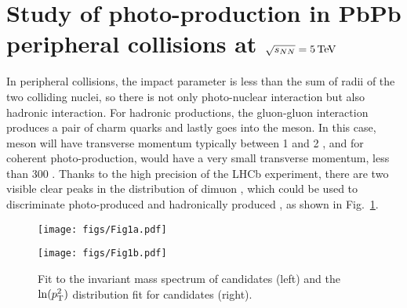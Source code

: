 \documentclass{appolb}
\begin{document}
\section{Study of \jpsi photo-production in PbPb peripheral collisions at $\sqrt{s_{NN}}= 5\text{\,Te\kern -0.1em V}$~\cite{LHCb:2021hoq}}
In peripheral collisions, the impact parameter is less than the sum of radii of the two colliding nuclei, so there is not only photo-nuclear interaction but also hadronic interaction. 
For hadronic productions, the gluon-gluon interaction produces a pair of charm quarks and lastly goes into the \jpsi meson. In this case, \jpsi meson will have transverse momentum typically between 1 and 2 \gevc, and for coherent photo-production, \jpsi would have a very small transverse momentum, less than 300 \mevc. 
Thanks to the high precision of the LHCb experiment, there are two visible clear peaks in the distribution of dimuon  , which could be used to discriminate photo-produced and hadronically produced \jpsi, as shown in Fig.~\ref{PC2d}.
\begin{figure}[!htbp]
\vspace{-1cm}
    \centering
    \hfil
    \begin{minipage}[t]{0.49\linewidth}
        \centering
        \texttt{[image: figs/Fig1a.pdf]}
    \end{minipage}
    \begin{minipage}[t]{0.49\linewidth}
        \centering
        \texttt{[image: figs/Fig1b.pdf]}
    \end{minipage}
    \hfil
    \caption{Fit to the invariant mass spectrum of \jpsi candidates (left) and the \ensuremath{\ln(\pt^{2})}\xspace distribution fit for \jpsi candidates (right).}
    \label{PC2d}
\end{figure}
\end{document}
